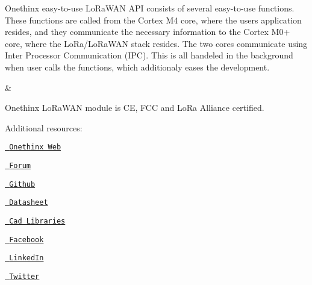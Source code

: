 \begin{longtabu}
Onethinx easy-\/to-\/use Lo\+Ra\+WAN API consists of several easy-\/to-\/use functions. These functions are called from the Cortex M4 core, where the users application resides, and they communicate the necessary information to the Cortex M0+ core, where the Lo\+Ra/\+Lo\+Ra\+WAN stack resides. The two cores communicate using Inter Processor Communication (IPC). This is all handeled in the background when user calls the functions, which additionaly eases the development.

& \\
\end{longtabu}


Onethinx Lo\+Ra\+WAN module is CE, FCC and Lo\+Ra Alliance certified.

Additional resources\+:
\begin{DoxyItemize}
\item \href{https://www.onethinx.com/}{\texttt{ Onethinx Web}}
\item \href{https://forum.onethinx.com/}{\texttt{ Forum}}
\item \href{https://github.com/onethinx}{\texttt{ Github}}
\item \href{https://github.com/onethinx/Core_Datasheet}{\texttt{ Datasheet}}
\item \href{https://github.com/onethinx/CAD_libraries}{\texttt{ Cad Libraries}}
\item \href{https://www.facebook.com/Onethinx}{\texttt{ Facebook}}
\item \href{https://www.linkedin.com/company/onethinx}{\texttt{ Linked\+In}}
\item \href{https://twitter.com/onethinx}{\texttt{ Twitter}} 
\end{DoxyItemize}